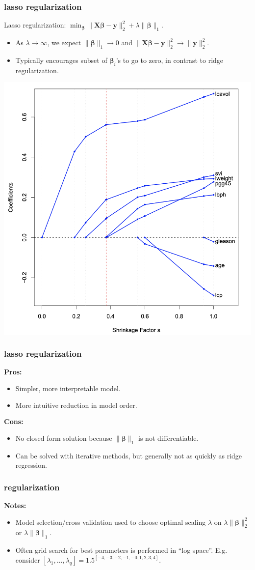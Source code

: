 \documentclass[handout,compress]{beamer}
\newcommand{\bs}[1]{\boldsymbol{#1}}
\newcommand{\bv}[1]{\mathbf{#1}}
\begin{document}
\begin{frame}
	\frametitle{lasso regularization}
		\begin{center}
		Lasso regularization: $\min_{\bs{\beta}} \|\bv{X}\bs{\beta} - \bv{y}\|_2^2 + \lambda \|\bs{\beta}\|_1$.
	\end{center}
	\begin{itemize}
		\item As $\lambda \rightarrow \infty$, we expect $\|\bs{\beta}\|_1 \rightarrow 0$ and $\|\bv{X}\bs{\beta} - \bv{y}\|_2^2 \rightarrow \|\bv{y}\|_2^2$.
		\item Typically encourages subset of $\bs{\beta}_i$'s to go to zero, in contrast to ridge regularization.
	\end{itemize}
	\vspace{-1em}
	\begin{center}
		\includegraphics[width=.4\textwidth]{lasso_coeffs.png}
	\end{center}
\end{frame}

\begin{frame}
	\frametitle{lasso regularization}
	\textbf{Pros:}
	\begin{itemize}
		\item Simpler, more interpretable model.
		\item More intuitive reduction in model order.
	\end{itemize}

	\textbf{Cons:}
\begin{itemize}
	\item No closed form solution because $\|\bs{\beta}\|_1$ is not differentiable. 
	\item Can be solved with iterative methods, but generally not as quickly as ridge regression.
\end{itemize}
	
\end{frame}

\begin{frame}
	\frametitle{regularization}
	\textbf{Notes:}
	\begin{itemize}
		\item Model selection/cross validation used to choose optimal scaling $\lambda$ on $\lambda \|\bs{\beta}\|_2^2$ or $\lambda \|\bs{\beta}\|_1$. 
		\item Often grid search for best parameters is performed in ``log space''. E.g. consider $[\lambda_1, \ldots,\lambda_q] = 1.5^{[-4,-3,-2,-1,-0,1,2,3,4]}$. 
	\end{itemize}
	
\end{frame}
\end{document}
